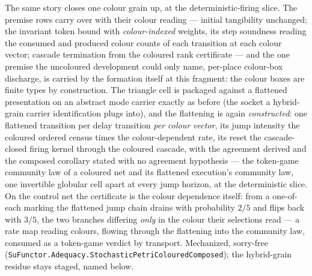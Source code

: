 The same story closes one colour grain up, at the
deterministic-firing slice.  The premise rows carry over with their
colour reading --- initial tangibility unchanged; the invariant token
bound with \emph{colour-indexed} weights, its step soundness reading
the consumed and produced colour counts of each transition at each
colour vector; cascade termination from the coloured rank
certificate --- and the one premise the uncoloured development could
only name, per-place colour-box discharge, is carried by the
formation itself at this fragment: the colour boxes are finite types
by construction.  The triangle cell is packaged against a flattened
presentation on an abstract mode carrier exactly as before (the
socket a hybrid-grain carrier identification plugs into), and the
flattening is again \emph{constructed}: one flattened transition per
delay transition \emph{per colour vector}, its jump intensity the
coloured ordered census times the colour-dependent rate, its reset
the cascade-closed firing kernel through the coloured cascade, with
the agreement derived and the composed corollary stated with no
agreement hypothesis --- the token-game community law of a coloured
net and its flattened execution's community law, one invertible
globular cell apart at every jump horizon, at the deterministic
slice.  On the control net the certificate is the colour dependence
itself: from a one-of-each marking the flattened jump chain drains
with probability $2/5$ and flips back with $3/5$, the two branches
differing \emph{only} in the colour their selections read --- a rate
map reading colours, flowing through the flattening into the
community law, consumed as a token-game verdict by transport.
Mechanized, sorry-free
(\texttt{SuFunctor.Adequacy.StochasticPetriColouredComposed}); the
hybrid-grain residue stays staged, named below.

